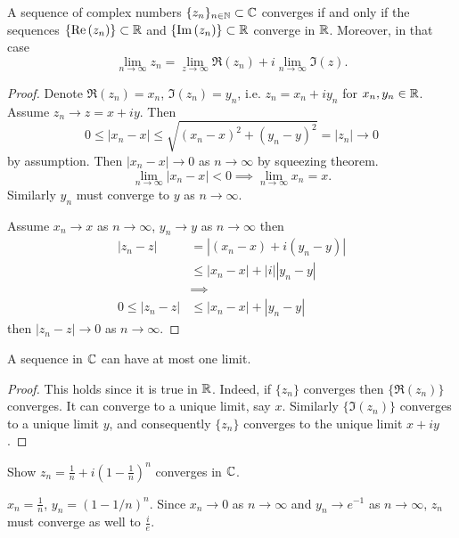 \documentclass[10pt, a4paper]{article}
\begin{document}
\begin{lemma}
    A sequence of complex numbers $\{z_n\}_{n \in \mathbb{N}} \subset \mathbb{C}$ converges if and only if the sequences $\{\mathrm{Re}\,(z_n)\} \subset \mathbb{R}$ and $\{\mathrm{Im}\,(z_n)\} \subset \mathbb{R}$ converge in $\mathbb{R}$.
    Moreover,
    in that case
    \[
    \lim_{n \to \infty}z_n = \lim_{z \to \infty}\Re(z_n) + i\lim_{n \to \infty}\Im(z).
    \]

    \begin{proof}
        Denote $\Re(z_n) = x_n$,
        $\Im(z_n) = y_n$,
        i.e. $z_n = x_n + iy_n$ for $x_n, y_n \in \mathbb{R}$.
        Assume $z_n \to z = x + iy$.
        Then
        \[
        0 \leq |x_n - x| \leq \sqrt{(x_n - x) ^ 2 + (y_n - y) ^ 2} = |z_n| \to 0
        \]
        by assumption.
        Then $|x_n - x| \to 0$ as $n \to \infty$ by squeezing theorem.
        \[
        \lim_{n \to \infty}|x_n - x| < 0 \implies \lim_{n \to \infty}x_n = x.
        \]
        Similarly $y_n$ must converge to $y$ as $n \to \infty$.

        Assume $x_n \to x$ as $n \to \infty$,
        $y_n \to y$ as $n \to \infty$ then
        \begin{align*}
            |z_n - z| &= |(x_n - x) + i(y_n - y)| \\
            &\leq |x_n - x| + |i||y_n - y| \\
            &\implies \\
            0 \leq |z_n - z| &\leq |x_n - x| + |y_n - y|
        \end{align*}
        then $|z_n - z| \to 0$ as $n \to \infty$.
    \end{proof}
\end{lemma}

\begin{corollary}
    A sequence in $\mathbb{C}$ can have at most one limit.

    \begin{proof}
        This holds since it is true in $\mathbb{R}$.
        Indeed,
        if $\{z_n\}$ converges then $\{\Re(z_n)\}$ converges.
        It can converge to a unique limit,
        say $x$.
        Similarly $\{\Im(z_n)\}$ converges to a unique limit $y$,
        and consequently $\{z_n\}$ converges to the unique limit $x + iy$.
    \end{proof}
\end{corollary}

\begin{example}
    Show $z_n = \frac{1}{n} + i\left(1 - \frac{1}{n}\right) ^ n$ converges in $\mathbb{C}$.

    \begin{solution}
        $x_n = \frac{1}{n}$,
        $y_n = (1 - 1 / n) ^ n$.
        Since $x_n \to 0$ as $n \to \infty$ and $y_n \to e ^ {-1}$ as $n \to \infty$,
        $z_n$ must converge as well to $\frac{i}{e}$.
    \end{solution}
\end{example}
\end{document}
